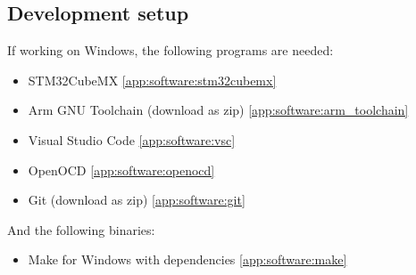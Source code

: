 \begin{appendices}


\section{Development setup} \label{app:devsetup}
If working on Windows, the following programs are needed:
\begin{itemize}
    \item STM32CubeMX \ref{app:software:stm32cubemx}
    \item Arm GNU Toolchain (download as zip) \ref{app:software:arm_toolchain}
    \item Visual Studio Code \ref{app:software:vsc}
    \item OpenOCD \ref{app:software:openocd}
    \item Git (download as zip) \ref{app:software:git}
\end{itemize}

And the following binaries:
\begin{itemize}
    \item Make for Windows with dependencies \ref{app:software:make}
\end{itemize}


\end{appendices}
